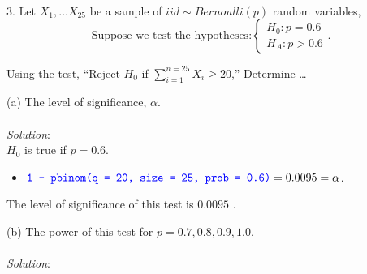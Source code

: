 \documentclass[12pt]{article}
\newcommand{\XB}{\color{black}}
\newcommand{\XBB}{\color{blue}}
\newcommand{\ds}{\displaystyle}
\begin{document}
\newpage
\XBB\hrulefill\XB \\

3. Let $ \ds X_{1}, \dots X_{25} $ be a sample of $ iid \sim Bernoulli(p) $ random variables, \\

\[
    \text{Suppose we test the hypotheses:}
    \left\{ 
        \begin{array}{rl}
            H_{0} : p = 0.6 \\
            H_{A} : p > 0.6
        \end{array}.
    \right.
\]

Using the test, ``Reject $ H_{0} $ if $ \ds \sum_{i=1}^{n=25} X_{i} \ge 20 $,'' Determine \dots \\

\XBB\hrulefill\XB 
\vspace{5mm} 

(a) The level of significance, $ \alpha $. \\
\vspace{2.5mm} \\
\textit{Solution}:
\vspace{2.5mm} \\ 

\noindent
$ H_{0} $ is true if $ p = 0.6 $. \\

\begin{itemize}
    \item $ \ds {\XBB \texttt{1 - pbinom(q = 20, size = 25, prob = 0.6)}} = 0.0095 = \alpha $.
\end{itemize}

\noindent
The level of significance of this test is $ 0.0095 $ . \\

\vspace{2.5mm}

(b) The power of this test for $ p = 0.7, 0.8, 0.9, 1.0 $.  \\
\vspace{2.5mm} \\
\textit{Solution}:
\vspace{2.5mm} \\
\end{document}
